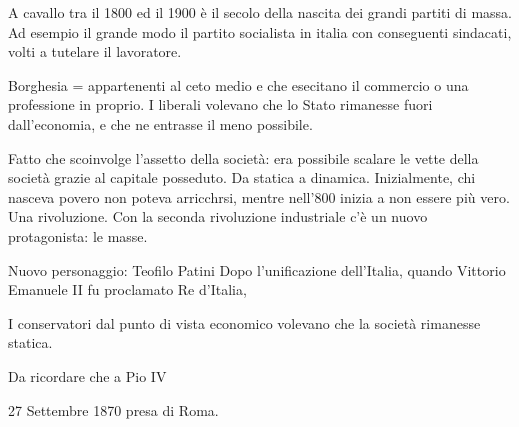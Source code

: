 \documentclass{article}
\begin{document}
    A cavallo tra il 1800 ed il 1900 è il secolo della nascita dei grandi partiti di massa. Ad esempio il grande modo il partito socialista in italia con conseguenti sindacati, volti a tutelare il lavoratore.

    Borghesia = appartenenti al ceto medio e che esecitano il commercio o una professione in proprio. I liberali volevano che lo Stato rimanesse fuori dall'economia, e che ne entrasse il meno possibile.

    Fatto che scoinvolge l'assetto della società: era possibile scalare le vette della società grazie al capitale posseduto. Da statica a dinamica. Inizialmente, chi nasceva povero non poteva arricchrsi, mentre nell'800 inizia a non essere più vero. Una rivoluzione.
    Con la seconda rivoluzione industriale c'è un nuovo protagonista: le masse.

    Nuovo personaggio: Teofilo Patini
    Dopo l'unificazione dell'Italia, quando Vittorio Emanuele II fu proclamato Re d'Italia, 

    I conservatori dal punto di vista economico volevano che la società rimanesse statica.

    Da ricordare che a Pio IV

    27 Settembre 1870 presa di Roma.
\end{document}
